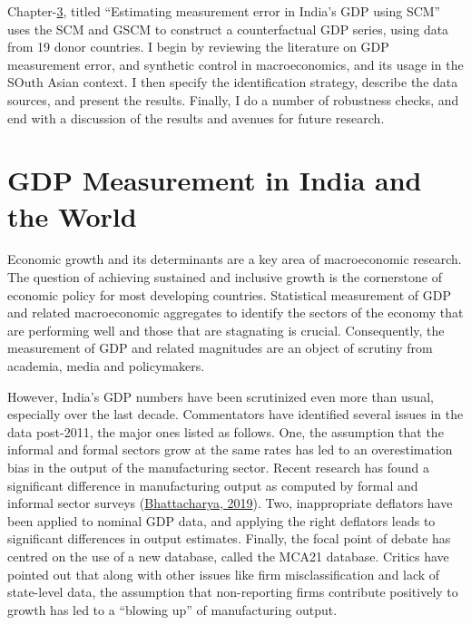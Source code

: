\documentclass[12pt,nobind, a4paper]{reedthesis}
\begin{document}
 Chapter-\protect\hyperlink{ch3}{3}, titled ``Estimating measurement error in India's GDP using SCM'' uses the SCM and GSCM to construct a counterfactual GDP series, using data from 19 donor countries. I begin by reviewing the literature on GDP measurement error, and synthetic control in macroeconomics, and its usage in the SOuth Asian context. I then specify the identification strategy, describe the data sources, and present the results. Finally, I do a number of robustness checks, and end with a discussion of the results and avenues for future research.

 \hypertarget{ch1}{%
 \chapter{GDP Measurement in India and the World}\label{ch1}}

 Economic growth and its determinants are a key area of macroeconomic research. The question of achieving sustained and inclusive growth is the cornerstone of economic policy for most developing countries. Statistical measurement of GDP and related macroeconomic aggregates to identify the sectors of the economy that are performing well and those that are stagnating is crucial. Consequently, the measurement of GDP and related magnitudes are an object of scrutiny from academia, media and policymakers.
 \linebreak

 However, India's GDP numbers have been scrutinized even more than usual, especially over the last decade. Commentators have identified several issues in the data post-2011, the major ones listed as follows. One, the assumption that the informal and formal sectors grow at the same rates has led to an overestimation bias in the output of the manufacturing sector. Recent research has found a significant difference in manufacturing output as computed by formal and informal sector surveys (\protect\hyperlink{ref-bhattacharya_great_2019}{Bhattacharya, 2019}). Two, inappropriate deflators have been applied to nominal GDP data, and applying the right deflators leads to significant differences in output estimates. Finally, the focal point of debate has centred on the use of a new database, called the MCA21 database. Critics have pointed out that along with other issues like firm misclassification and lack of state-level data, the assumption that non-reporting firms contribute positively to growth has led to a ``blowing up'' of manufacturing output.
 \linebreak
\end{document}
